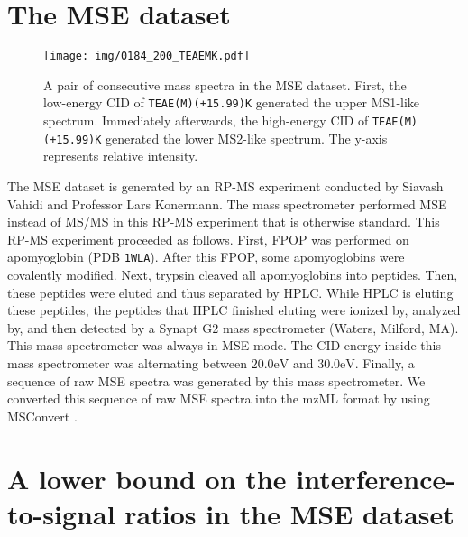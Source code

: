 \section{The \texorpdfstring{\gls{MSE}}{MSE} dataset}
\begin{figure}
\texttt{[image: img/0184\_200\_TEAEMK.pdf]}
\caption[
	A pair of consecutive mass spectra in the \gls{MSE} dataset.]{
	A pair of consecutive mass spectra in the \gls{MSE} dataset.
	First, the low-energy \gls{CID} of \texttt{TEAE(M)(+15.99)K} generated the upper \gls{MS1}-like spectrum.
	Immediately afterwards, the high-energy \gls{CID} of \texttt{TEAE(M)(+15.99)K} generated the lower \gls{MS2}-like spectrum. 
	The y-axis represents relative intensity.
	\label{fig:rpmse:dataset:TEAEMK196}
}
\end{figure}
	
The \gls{MSE} dataset is generated by an \gls{RP-MS} experiment conducted by Siavash Vahidi and Professor Lars Konermann.
The mass spectrometer performed \gls{MSE} instead of \gls{MS/MS} in this \gls{RP-MS} experiment that is otherwise standard. 
This \gls{RP-MS} experiment proceeded as follows.
First, \gls{FPOP} was performed on apomyoglobin (PDB \texttt{1WLA}).
After this \gls{FPOP}, some apomyoglobins were covalently modified. 
Next, trypsin cleaved all apomyoglobins into peptides.{}	
Then, these peptides were eluted and thus separated by \gls{HPLC}.
While \gls{HPLC} is eluting these peptides, the peptides that \gls{HPLC} finished eluting were ionized by, analyzed by, and then detected by a Synapt G2 mass spectrometer (Waters, Milford, MA).
This mass spectrometer was always in \gls{MSE} mode.
The \gls{CID} energy inside this mass spectrometer was alternating between \(20.0\si{\eV}\) and \(30.0\si{\eV}\).	
Finally, a sequence of raw \gls{MSE} spectra was generated by this mass spectrometer.
We converted this sequence of raw \gls{MSE} spectra into the mzML format by using MSConvert \cite{chambers2012cross}. 	

\section{A lower bound on the interference-to-signal ratios in the \texorpdfstring{\gls{MSE}}{MSE} dataset}

